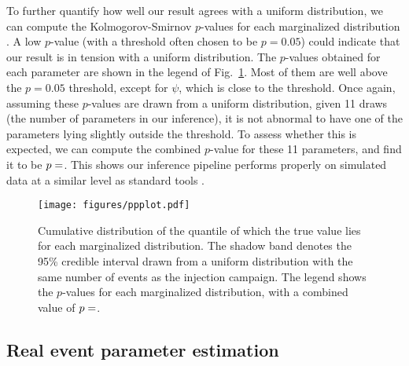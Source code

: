 \documentclass[twocolumn]{aastex631}
\begin{document}
To further quantify how well our result agrees with a uniform distribution, we
can compute the Kolmogorov-Smirnov $p$-values for each marginalized
distribution \citep{doi:10.1080/01621459.1968.11009335}.
A low $p$-value (with a threshold often
chosen to be $p = 0.05$) could indicate that our result is in tension with a uniform
distribution. The $p$-values obtained for each parameter are shown in the
legend of Fig.~\ref{fig:ppplot}. Most of them are well above the $p = 0.05$
threshold, except for $\psi$, which is close to the threshold. Once
again, assuming these $p$-values are drawn from a uniform distribution, given
11 draws (the number of parameters in our inference), it is not abnormal to
have one of the parameters lying slightly outside the threshold. To assess
whether this is expected, we can compute the combined $p$-value for these 11
parameters, and find it to be $p = $.  This shows our inference pipeline
performs properly on simulated data at a similar level as standard tools
\citep{Veitch:2014wba,Romero-Shaw:2020owr}.

\begin{figure}
    \texttt{[image: figures/ppplot.pdf]}
    \caption{Cumulative distribution of the quantile of which the true value
    lies for each marginalized distribution. The shadow band denotes the 95\%
    credible interval drawn from a uniform distribution with the same number of
    events as the injection campaign. The legend shows the $p$-values for each
    marginalized distribution, with a combined value of $p = $.}
    \label{fig:ppplot}
\end{figure}

\subsection{Real event parameter estimation}
\end{document}
